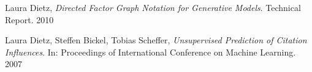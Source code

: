 \documentclass[11pt]{report}
\begin{document}
\begin{thebibliography}{9}

  Laura Dietz,
  \emph{Directed Factor Graph Notation for Generative Models}.
  Technical Report. 2010

  Laura Dietz, Steffen Bickel, Tobias Scheffer,
  \emph{Unsupervised Prediction of Citation Influences}.
  In: Proceedings of International Conference on Machine
  Learning. 2007


\end{thebibliography}
\end{document}
